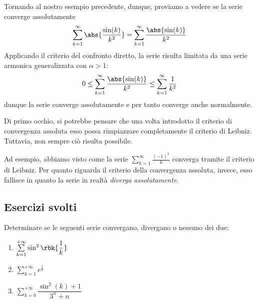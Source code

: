 \documentclass[a4paper, 12pt]{report}
\begin{document}

    Tornando al nostro esempio precedente, dunque, proviamo a vedere se la serie converge assolutamente
    \[\sum_{k=1}^{\infty} \abs{\frac{\sin(k)}{k^2}} = \sum_{k=1}^{\infty} \frac{\abs{\sin(k)}}{k^2}\]
    Applicando il criterio del confronto diretto, la serie risulta limitata da una serie armonica generalizzata con $\alpha > 1$:
    \[ 0 \leq \sum_{k=1}^{\infty} \frac{\abs{\sin(k)}}{k^2} \leq \sum_{k=1}^{\infty} \frac{1}{k^2}\]
    dunque la serie converge assolutamente e per tanto converge anche normalmente.
    
    Di primo occhio, si potrebbe pensare che una volta introdotto il criterio di convergenza assoluta esso possa rimpiazzare completamente il criterio di Leibniz. Tuttavia, non sempre ciò risulta possibile.

    Ad esempio, abbiamo visto come la serie $\sum\limits_{k=1}^{\infty} \frac{(-1)^k}{k}$ converga tramite il criterio di Leibniz. Per quanto riguarda il criterio della convergenza assoluta, invece, esso fallisce in quanto la serie in realtà \textit{diverga assolutamente}.
    
    \subsection{Esercizi svolti}

    \begin{framedprob}{}
        Determinare se le seguenti serie convergano, divergano o nessuno dei due:
        \begin{enumerate}
            \item $\sum\limits_{k = 1}^{+\infty} \sin^2 \rbk{\dfrac{1}{k}}$
            \item $\sum\limits_{k = 1}^{+\infty} e^{\frac{1}{k}}$
            \item $\sum\limits_{k = 0}^{+\infty} \dfrac{\sin^2 (k) + 1}{3^n + n} $
        \end{enumerate}
    \end{framedprob}
\end{document}
